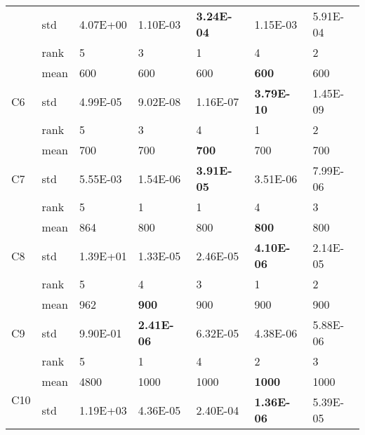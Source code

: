 \begin{table}[]
\begin{tabular}{|l|l|l|l|l|l|l|}
                     & std  & 4.07E+00 & 1.10E-03          & \textbf{3.24E-04} & 1.15E-03          & 5.91E-04          \\ \cline{2-7} 
                     & rank & 5        & 3                 & 1                 & 4                 & 2                 \\ \hline
\multirow{3}{*}{C6}  & mean & 600      & 600               & 600               & \textbf{600}      & 600               \\ \cline{2-7} 
                     & std  & 4.99E-05 & 9.02E-08          & 1.16E-07          & \textbf{3.79E-10} & 1.45E-09          \\ \cline{2-7} 
                     & rank & 5        & 3                 & 4                 & 1                 & 2                 \\ \hline
\multirow{3}{*}{C7}  & mean & 700      & 700               & \textbf{700}      & 700               & 700               \\ \cline{2-7} 
                     & std  & 5.55E-03 & 1.54E-06          & \textbf{3.91E-05} & 3.51E-06          & 7.99E-06          \\ \cline{2-7} 
                     & rank & 5        & 1                 & 1                 & 4                 & 3                 \\ \hline
\multirow{3}{*}{C8}  & mean & 864      & 800               & 800               & \textbf{800}      & 800               \\ \cline{2-7} 
                     & std  & 1.39E+01 & 1.33E-05          & 2.46E-05          & \textbf{4.10E-06} & 2.14E-05          \\ \cline{2-7} 
                     & rank & 5        & 4                 & 3                 & 1                 & 2                 \\ \hline
\multirow{3}{*}{C9}  & mean & 962      & \textbf{900}      & 900               & 900               & 900               \\ \cline{2-7} 
                     & std  & 9.90E-01 & \textbf{2.41E-06} & 6.32E-05          & 4.38E-06          & 5.88E-06          \\ \cline{2-7} 
                     & rank & 5        & 1                 & 4                 & 2                 & 3                 \\ \hline
\multirow{3}{*}{C10} & mean & 4800     & 1000              & 1000              & \textbf{1000}     & 1000              \\ \cline{2-7} 
                     & std  & 1.19E+03 & 4.36E-05          & 2.40E-04          & \textbf{1.36E-06} & 5.39E-05          \\ \cline{2-7} 

\end{tabular}
\end{table}
